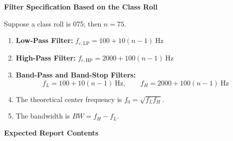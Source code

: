 \documentclass[12pt,a4paper]{article}
\begin{document}
\vspace{0.3cm}

\begin{center}
\textbf{Filter Specification Based on the Class Roll}
\end{center}

\begingroup
Suppose a class roll is 075; then $n=75$.
\begin{enumerate}[leftmargin=0.55cm,itemsep=0pt,topsep=2pt]
  \item \textbf{Low-Pass Filter:} $f_{c,\mathrm{LP}}=100+10(n-1)\ \mathrm{Hz}$
  \item \textbf{High-Pass Filter:} $f_{c,\mathrm{HP}}=2000+100(n-1)\ \mathrm{Hz}$
  \item \textbf{Band-Pass and Band-Stop Filters:}
  \[
    f_L=100+10(n-1)\ \mathrm{Hz}, \qquad
    f_H=2000+100(n-1)\ \mathrm{Hz}
  \]
  \item The theoretical center frequency is $f_0=\sqrt{f_Lf_H}$.
  \item The bandwidth is $BW=f_H-f_L$.
\end{enumerate}
\endgroup

\textbf{Expected Report Contents}
\end{document}
